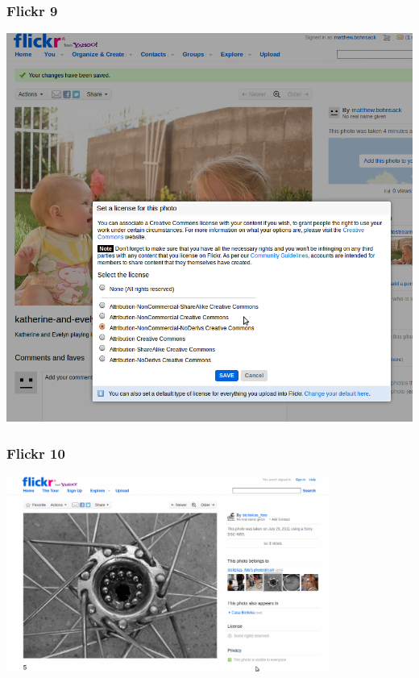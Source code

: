 \documentclass[mathserif,xcolor=dvipsnames,handout]{beamer}
\begin{document}
    \begin{frame}[t]
        \frametitle{Flickr 9}
        \begin{center}
            \includegraphics[height=0.8\textheight]{set-you-license-on-flickr.png}
        \end{center}
    \end{frame}
    \begin{frame}[t]
        \frametitle{Flickr 10}
        \begin{center}
            \includegraphics[width=0.8\textwidth]{view-cc-licensed-photo-on-flickr.png}
        \end{center}
    \end{frame}
\end{document}
